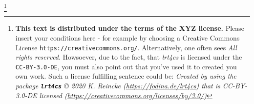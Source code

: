 

\footnote{\textbf{This text is distributed under the terms of the XYZ license.} Please insert your conditions here - for example by choosing a Creative Commons License \texttt{https://creativecommons.org/}. Alternatively, one often sees \emph{All rights reserved}. Howsoever, due to the fact, that \textit{lrt4cs} is licensed under the \texttt{CC-BY-3.0-DE}, you must also point out that you've used it to created you own work. Such a license fulfilling sentence could be:\newline
{\small\itshape Created by using the package \texttt{\textbf{lrt4cs}} \copyright{} 2020 K. Reincke (\href{https://fodina.de/lrt4cs}{https://fodina.de/lrt4cs}) that is CC-BY-3.0-DE licensed (\href{https://creativecommons.org/licenses/by/3.0/}{https://creativecommons.org/licenses/by/3.0/})}}
